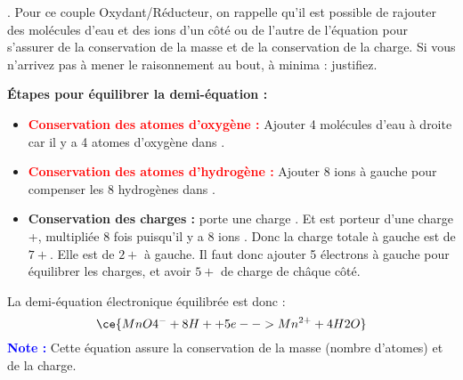 \documentclass[answers]{exam}
\begin{document}
\begin{questions}
\question[2] . Pour ce couple Oxydant/Réducteur, on rappelle qu'il est possible de rajouter des molécules d'eau  et des ions  d'un côté ou de l'autre de l'équation pour s'assurer de la conservation de la masse et de la conservation de la charge. Si vous n'arrivez pas à mener le raisonnement au bout, à minima : justifiez.
\begin{solution}
  \textbf{Étapes pour équilibrer la demi-équation :}
  \begin{itemize}[noitemsep]
    \item \textcolor{red}{\textbf{Conservation des atomes d'oxygène :}} Ajouter 4 molécules d'eau  à droite car il y a 4 atomes d'oxygène dans .
    \item \textcolor{red}{\textbf{Conservation des atomes d'hydrogène :}} Ajouter 8 ions  à gauche pour compenser les 8 hydrogènes dans .
    \item \textbf{Conservation des charges :}  porte une charge .  Et  est porteur d'une charge +, multipliée 8 fois puisqu'il y a 8 ions . Donc la charge totale à gauche est de $7+$. Elle est de $2+$ à gauche. Il faut donc ajouter 5 électrons à gauche pour équilibrer les charges, et avoir $5+$ de charge de châque côté.
  \end{itemize}

  La demi-équation électronique équilibrée est donc :
  \[
  \ce{MnO4^- + 8H+ + 5e- -> Mn^{2+} + 4H2O}
  \]
  \textcolor{blue}{\textbf{Note :}} Cette équation assure la conservation de la masse (nombre d'atomes) et de la charge.
\end{solution}


\end{questions}
\end{document}
